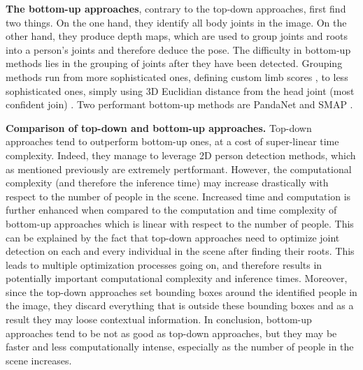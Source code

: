 \documentclass[runningheads]{llncs}
\begin{document}
\textbf{The bottom-up approaches}, contrary to the top-down approaches, first find two things. On the one hand, they identify all body joints in the image. On the other hand, they produce depth maps, which are used to group joints and roots into a person's joints and therefore deduce the pose. The difficulty in bottom-up methods lies in the grouping of joints after they have been detected. Grouping methods run from more sophisticated ones, defining custom limb scores \cite{limb score}, to less sophisticated ones, simply using 3D Euclidian distance from the head joint (most confident join) \cite{bottom up 3D distance}.
Two performant bottom-up methods are PandaNet \cite{PandaNet} and SMAP \cite{SMAP}.

\textbf{Comparison of top-down and bottom-up approaches.} Top-down approaches tend to outperform bottom-up ones, at a cost of super-linear time complexity. Indeed, they manage to leverage 2D person detection methods, which as mentioned previously are extremely pertformant. However, the computational complexity (and therefore the inference time) may increase drastically with respect to the number of people in the scene. Increased time and computation is further enhanced when compared to the computation and time complexity of bottom-up approaches which is linear with respect to the number of people. This can be explained by the fact that top-down approaches need to optimize joint detection on each and every individual in the scene after finding their roots. This leads to multiple optimization processes going on, and therefore results in potentially important computational complexity and inference times. Moreover, since the top-down approaches set bounding boxes around the identified people in the image, they discard everything that is outside these bounding boxes and as a result they may loose contextual information. In conclusion, bottom-up approaches tend to be not as good as top-down approaches, but they may be faster and less computationally intense, especially as the number of people in the scene increases.
\end{document}
